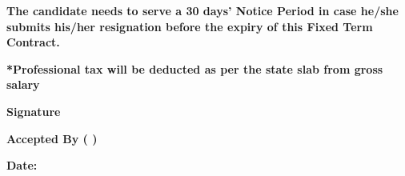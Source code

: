 \documentclass[11pt,a4paper]{article}
\begin{document}
\textbf{The candidate needs to serve a 30 days' Notice Period in case he/she submits his/her resignation before the expiry of this Fixed Term Contract.}

\vspace{0.3cm}

\textbf{*Professional tax will be deducted as per the state slab from gross salary}

\vspace{0.3cm}

\textbf{Signature}

\vspace{0.1cm}

\textbf{}

\vspace{0.15cm}

\textbf{Accepted By (  )}

\vspace{0.15cm}

\textbf{Date: }
\end{document}
